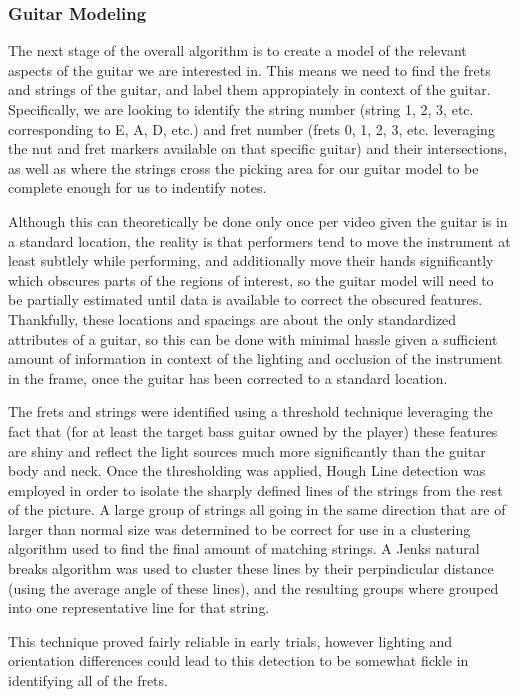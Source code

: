 \subsubsection{Guitar Modeling}
The next stage of the overall algorithm is to create a model of the relevant aspects of the guitar we are interested in.
This means we need to find the frets and strings of the guitar, and label them appropiately in context of the guitar.
Specifically, we are looking to identify the string number (string 1, 2, 3, etc. corresponding to E, A, D, etc.)
and fret number (frets 0, 1, 2, 3, etc. leveraging the nut and fret markers available on that specific guitar) and
their intersections, as well as where the strings cross the picking area for our guitar model to be complete enough
for us to indentify notes.
\par
Although this can theoretically be done only once per video given the guitar is in a standard location, 
the reality is that performers tend to move the instrument at least subtlely while performing,
and additionally move their hands significantly which obscures parts of the regions of interest,
so the guitar model will need to be partially estimated until data is available to correct the obscured features.
Thankfully, these locations and spacings are about the only standardized attributes of a guitar,
so this can be done with minimal hassle given a sufficient amount of information in context of the lighting
and occlusion of the instrument in the frame, once the guitar has been corrected to a standard location.
\par
The frets and strings were identified using a threshold technique leveraging the fact that
(for at least the target bass guitar owned by the player) these features are shiny and reflect
the light sources much more significantly than the guitar body and neck.
Once the thresholding was applied, Hough Line detection was employed in order to isolate the sharply
defined lines of the strings from the rest of the picture. A large group of strings all going in the same
direction that are of larger than normal size was determined to be correct for use in a clustering algorithm
used to find the final amount of matching strings. A Jenks natural breaks algorithm was used to cluster these
lines by their perpindicular distance (using the average angle of these lines), and the resulting groups
where grouped into one representative line for that string.
\par
This technique proved fairly reliable in early trials, however lighting and orientation
differences could lead to this detection to be somewhat fickle in identifying all of the frets.
